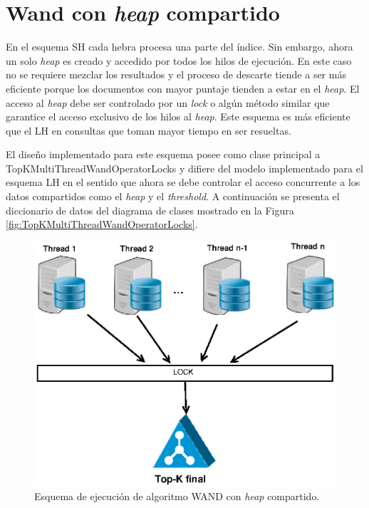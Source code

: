 \section{Wand con \textit{heap} compartido}
\label{scheduling:whc}
En el esquema SH cada hebra procesa una parte del índice. Sin embargo, ahora un solo \textit{heap} es creado y accedido por todos los hilos de ejecución. En este caso no se requiere mezclar los resultados y el proceso de descarte tiende a ser más eficiente porque los documentos con mayor puntaje tienden a estar en el \textit{heap}. El acceso al \textit{heap} debe ser controlado por un \textit{lock} o algún método similar que garantice el acceso exclusivo de los hilos al \textit{heap}. Este esquema es más eficiente que el LH en consultas que toman mayor tiempo en ser resueltas.

El diseño implementado para este esquema posee como clase principal a TopKMultiThreadWandOperatorLocks y difiere del modelo implementado para el esquema LH en el sentido que ahora se debe controlar el acceso concurrente a los datos compartidos como el \textit{heap} y el \textit{threshold}. A continuación se presenta el diccionario de datos del diagrama de clases mostrado en la Figura \ref{fig:TopKMultiThreadWandOperatorLocks}.

\begin{figure}[tp]
\centering
\includegraphics[scale=.75]{images/wand_heaps_compartido.eps}
\caption{Esquema de ejecución de algoritmo WAND con \textit{heap} compartido.}
\label{fig:wand-heap-compartido}
\end{figure}

